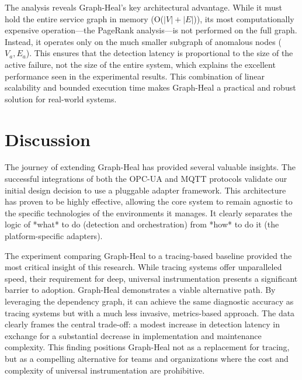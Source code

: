 \documentclass[11pt,conference]{IEEEtran}
\begin{document}
\begin{table}[h!]
\centering
\caption{Theoretical Complexity of RCA Approaches}
\label{tab:complexity-analysis}
\end{table}

The analysis reveals Graph-Heal's key architectural advantage. While it must hold the entire service graph in memory (O($|V| + |E|$)), its most computationally expensive operation—the PageRank analysis—is not performed on the full graph. Instead, it operates only on the much smaller subgraph of anomalous nodes ($V_a, E_a$). This ensures that the detection latency is proportional to the size of the active failure, not the size of the entire system, which explains the excellent performance seen in the experimental results. This combination of linear scalability and bounded execution time makes Graph-Heal a practical and robust solution for real-world systems.

\section{Discussion}
\label{sec:discussion}
The journey of extending Graph-Heal has provided several valuable insights. The successful integrations of both the OPC-UA and MQTT protocols validate our initial design decision to use a pluggable adapter framework. This architecture has proven to be highly effective, allowing the core system to remain agnostic to the specific technologies of the environments it manages. It clearly separates the logic of *what* to do (detection and orchestration) from *how* to do it (the platform-specific adapters).

The experiment comparing Graph-Heal to a tracing-based baseline provided the most critical insight of this research. While tracing systems offer unparalleled speed, their requirement for deep, universal instrumentation presents a significant barrier to adoption. Graph-Heal demonstrates a viable alternative path. By leveraging the dependency graph, it can achieve the same diagnostic accuracy as tracing systems but with a much less invasive, metrics-based approach. The data clearly frames the central trade-off: a modest increase in detection latency in exchange for a substantial decrease in implementation and maintenance complexity. This finding positions Graph-Heal not as a replacement for tracing, but as a compelling alternative for teams and organizations where the cost and complexity of universal instrumentation are prohibitive.
\end{document}
